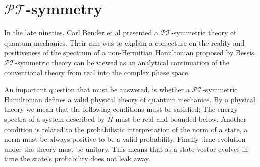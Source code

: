 \documentclass[12pt, a4paper]{report}
\newcommand\PT{\(\mathcal{PT}\)}
\begin{document}
\section{\texorpdfstring{$\mathcal{PT}$}\:-symmetry}\label{PT}
In the late nineties, Carl Bender et al presented a \PT-symmetric theory of quantum mechanics. Their aim was to explain a conjecture on the reality and positiveness of the spectrum of a non-Hermitian Hamiltonian proposed by Bessis\cite{Bender1998}. \PT-symmetric theory can be viewed as an analytical continuation of the conventional theory from real into the complex phase space\cite{PT-symmetricQM}.

An important question that must be answered, is whether a \PT-symmetric Hamiltonian defines a valid physical theory of quantum mechanics. By a physical theory we mean that the following conditions must be satisfied; The energy spectra of a system described by $\hat{H}$ must be real and bounded below. Another condition is related to the probabilistic interpretation of the norm of a state, a norm must be always positive to be a valid probability. Finally time evolution under the theory must be unitary. This means that as a state vector evolves in time the state's probability does not leak away\cite{MustaHbeHermitian}\cite{MakingSense}.

\end{document}
